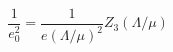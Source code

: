 \begin{equation}\label{Bare_Coupling_Constant}
\frac{1}{e_0^2} = \frac{1}{e(\Lambda/\mu)^2} Z_3(\Lambda/\mu)
\end{equation}


